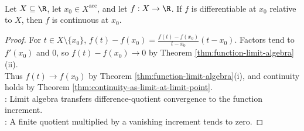 \begin{theorem} \label{thm:differentiable-implies-continuous} \\
Let $X\subseteq\R$, let $x_0\in X^{\operatorname{acc}}$, and let $f:X\to\R$. If $f$ is differentiable at $x_0$ relative to $X$, then $f$ is continuous at $x_0$.
\begin{proof}
For $t\in X\setminus\{x_0\}$, $f(t)-f(x_0)=\frac{f(t)-f(x_0)}{t-x_0}(t-x_0)$. Factors tend to $f'(x_0)$ and $0$, so $f(t)-f(x_0)\to0$ by Theorem \ref{thm:function-limit-algebra}(ii).\\
Thus $f(t)\to f(x_0)$ by Theorem \ref{thm:function-limit-algebra}(i), and continuity holds by Theorem \ref{thm:continuity-as-limit-at-limit-point}.\\
: Limit algebra transfers difference-quotient convergence to the function increment.\\
: A finite quotient multiplied by a vanishing increment tends to zero.
\end{proof}
\end{theorem}

